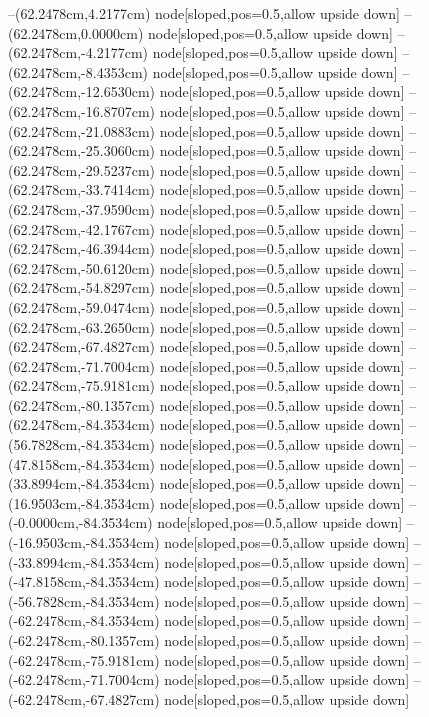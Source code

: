 --(62.2478cm,4.2177cm) node[sloped,pos=0.5,allow upside down]{\ArrowIn}
--(62.2478cm,0.0000cm) node[sloped,pos=0.5,allow upside down]{\ArrowIn}
--(62.2478cm,-4.2177cm) node[sloped,pos=0.5,allow upside down]{\ArrowIn}
--(62.2478cm,-8.4353cm) node[sloped,pos=0.5,allow upside down]{\ArrowIn}
--(62.2478cm,-12.6530cm) node[sloped,pos=0.5,allow upside down]{\ArrowIn}
--(62.2478cm,-16.8707cm) node[sloped,pos=0.5,allow upside down]{\ArrowIn}
--(62.2478cm,-21.0883cm) node[sloped,pos=0.5,allow upside down]{\ArrowIn}
--(62.2478cm,-25.3060cm) node[sloped,pos=0.5,allow upside down]{\ArrowIn}
--(62.2478cm,-29.5237cm) node[sloped,pos=0.5,allow upside down]{\ArrowIn}
--(62.2478cm,-33.7414cm) node[sloped,pos=0.5,allow upside down]{\ArrowIn}
--(62.2478cm,-37.9590cm) node[sloped,pos=0.5,allow upside down]{\ArrowIn}
--(62.2478cm,-42.1767cm) node[sloped,pos=0.5,allow upside down]{\ArrowIn}
--(62.2478cm,-46.3944cm) node[sloped,pos=0.5,allow upside down]{\ArrowIn}
--(62.2478cm,-50.6120cm) node[sloped,pos=0.5,allow upside down]{\ArrowIn}
--(62.2478cm,-54.8297cm) node[sloped,pos=0.5,allow upside down]{\ArrowIn}
--(62.2478cm,-59.0474cm) node[sloped,pos=0.5,allow upside down]{\ArrowIn}
--(62.2478cm,-63.2650cm) node[sloped,pos=0.5,allow upside down]{\ArrowIn}
--(62.2478cm,-67.4827cm) node[sloped,pos=0.5,allow upside down]{\ArrowIn}
--(62.2478cm,-71.7004cm) node[sloped,pos=0.5,allow upside down]{\ArrowIn}
--(62.2478cm,-75.9181cm) node[sloped,pos=0.5,allow upside down]{\ArrowIn}
--(62.2478cm,-80.1357cm) node[sloped,pos=0.5,allow upside down]{\ArrowIn}
--(62.2478cm,-84.3534cm) node[sloped,pos=0.5,allow upside down]{\ArrowIn}
--(56.7828cm,-84.3534cm) node[sloped,pos=0.5,allow upside down]{\ArrowIn}
--(47.8158cm,-84.3534cm) node[sloped,pos=0.5,allow upside down]{\ArrowIn}
--(33.8994cm,-84.3534cm) node[sloped,pos=0.5,allow upside down]{\ArrowIn}
--(16.9503cm,-84.3534cm) node[sloped,pos=0.5,allow upside down]{\ArrowIn}
--(-0.0000cm,-84.3534cm) node[sloped,pos=0.5,allow upside down]{\ArrowIn}
--(-16.9503cm,-84.3534cm) node[sloped,pos=0.5,allow upside down]{\ArrowIn}
--(-33.8994cm,-84.3534cm) node[sloped,pos=0.5,allow upside down]{\ArrowIn}
--(-47.8158cm,-84.3534cm) node[sloped,pos=0.5,allow upside down]{\ArrowIn}
--(-56.7828cm,-84.3534cm) node[sloped,pos=0.5,allow upside down]{\ArrowIn}
--(-62.2478cm,-84.3534cm) node[sloped,pos=0.5,allow upside down]{\ArrowIn}
--(-62.2478cm,-80.1357cm) node[sloped,pos=0.5,allow upside down]{\ArrowIn}
--(-62.2478cm,-75.9181cm) node[sloped,pos=0.5,allow upside down]{\ArrowIn}
--(-62.2478cm,-71.7004cm) node[sloped,pos=0.5,allow upside down]{\ArrowIn}
--(-62.2478cm,-67.4827cm) node[sloped,pos=0.5,allow upside down]{\ArrowIn}
